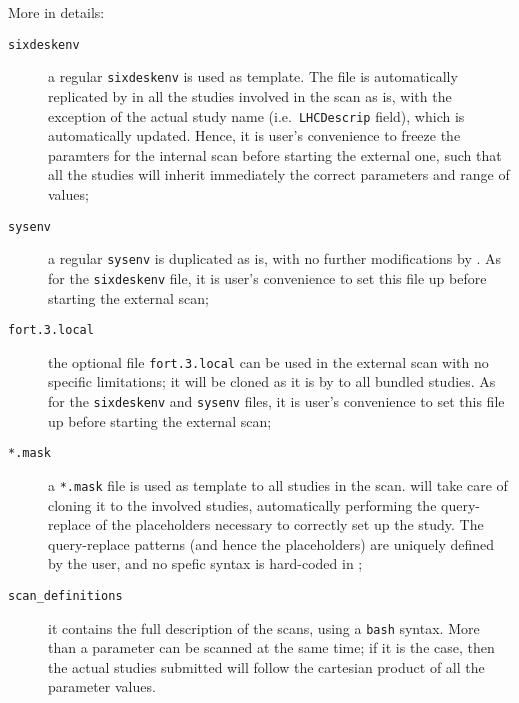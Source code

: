 More in details:
\begin{description}
\item[\texttt{sixdeskenv}] a regular \texttt{sixdeskenv} is used as template.
  The file is automatically replicated by \SIXDESK{} in all the studies
  involved in the scan as is, with the exception of the actual study name
  (i.e.~\texttt{LHCDescrip} field), which is automatically updated.
  Hence, it is user's convenience to freeze the paramters for the internal
  scan before starting the external one, such that all the studies will inherit
  immediately the correct parameters and range of values;
\item[\texttt{sysenv}] a regular \texttt{sysenv} is duplicated as is, with
  no further modifications by \SIXDESK{}. As for the \texttt{sixdeskenv} file, 
  it is user's convenience to set this file up before starting the
  external scan;
\item[\texttt{fort.3.local}] the optional file \texttt{fort.3.local}
  can be used in the external scan with no specific limitations; it
  will be cloned as it is by \SIXDESK{} to all bundled studies. As for the
  \texttt{sixdeskenv} and \texttt{sysenv} files, it is user's convenience
  to set this file up before starting the external scan;
\item[\texttt{*.mask}] a \texttt{*.mask} file is used as template to all studies
  in the scan. \SIXDESK{} will take care of cloning it to the involved studies,
  automatically performing the query-replace of the placeholders
  necessary to correctly set up the study. The query-replace patterns
  (and hence the placeholders) are uniquely defined by the user,
  and no spefic syntax is hard-coded in \SIXDESK{};
\item[\texttt{scan\_definitions}] it contains
  the full description of the scans, using a \texttt{bash} syntax. More than a
  parameter can be scanned at the same time; if it is the case, then the actual
  studies submitted will follow the cartesian product of all the parameter
  values.
\end{description}

